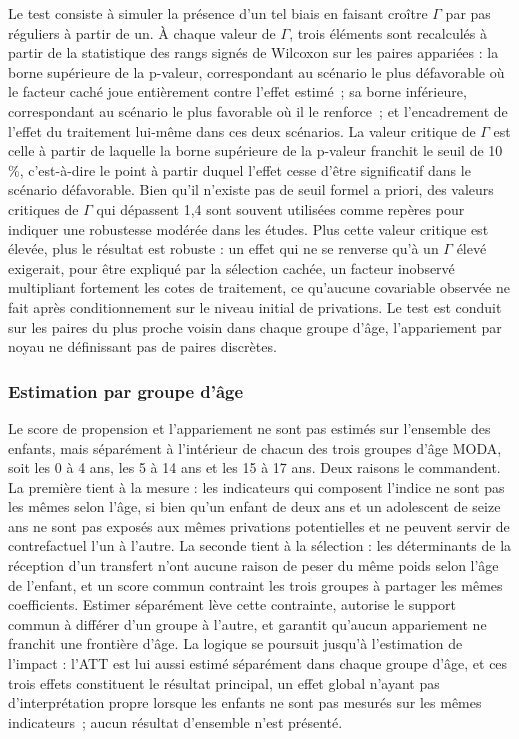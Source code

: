 Le test consiste à simuler la présence d'un tel biais en faisant croître
$\Gamma$ par pas réguliers à partir de un. À chaque valeur de $\Gamma$,
trois éléments sont recalculés à partir de la statistique des rangs
signés de Wilcoxon sur les paires appariées : la borne supérieure de la
p-valeur, correspondant au scénario le plus défavorable où le facteur
caché joue entièrement contre l'effet estimé~; sa borne inférieure,
correspondant au scénario le plus favorable où il le renforce~; et
l'encadrement de l'effet du traitement lui-même dans ces deux scénarios.
La valeur critique de $\Gamma$ est celle à partir de laquelle la borne
supérieure de la p-valeur franchit le seuil de 10\,\%, c'est-à-dire le
point à partir duquel l'effet cesse d'être significatif dans le scénario
défavorable. Bien qu'il n'existe pas de seuil formel a priori, des valeurs
critiques de $\Gamma$ qui dépassent 1,4 sont souvent utilisées comme
repères pour indiquer une robustesse modérée dans les études. Plus cette
valeur critique est élevée, plus le résultat est
robuste : un effet qui ne se renverse qu'à un $\Gamma$ élevé exigerait,
pour être expliqué par la sélection cachée, un facteur inobservé
multipliant fortement les cotes de traitement, ce qu'aucune covariable
observée ne fait après conditionnement sur le niveau initial de
privations. Le test est conduit sur les paires du plus proche voisin dans
chaque groupe d'âge, l'appariement par noyau ne définissant pas de paires
discrètes.

\subsubsection{Estimation par groupe d'âge}
Le score de propension et l'appariement ne sont pas estimés sur l'ensemble des
enfants, mais séparément à l'intérieur de chacun des trois groupes d'âge MODA,
soit les 0 à 4 ans, les 5 à 14 ans et les 15 à 17 ans. Deux raisons le
commandent. La première tient à la mesure : les indicateurs qui composent
l'indice ne sont pas les mêmes selon l'âge, si bien qu'un enfant de deux ans et
un adolescent de seize ans ne sont pas exposés aux mêmes privations
potentielles et ne peuvent servir de contrefactuel l'un à l'autre. La seconde
tient à la sélection : les déterminants de la réception d'un transfert n'ont
aucune raison de peser du même poids selon l'âge de l'enfant, et un score
commun contraint les trois groupes à partager les mêmes coefficients. Estimer
séparément lève cette contrainte, autorise le support commun à différer d'un
groupe à l'autre, et garantit qu'aucun appariement ne franchit une frontière
d'âge. La logique se poursuit jusqu'à l'estimation de l'impact : l'ATT est
lui aussi estimé séparément dans chaque groupe d'âge, et ces trois effets
constituent le résultat principal, un effet global n'ayant pas
d'interprétation propre lorsque les enfants ne sont pas mesurés sur les
mêmes indicateurs~; aucun résultat d'ensemble n'est présenté.


